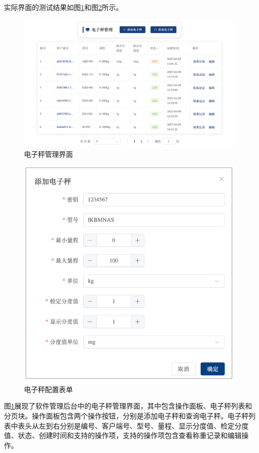 实际界面的测试结果如图\ref{fig:web-scale}和图\ref{fig:form-new-scale}所示。

\begin{figure}
    \centering
    \includegraphics[width=0.9\linewidth]{../result/web-scale.png}
    \caption{电子秤管理界面}
    \label{fig:web-scale}
\end{figure}

\begin{figure}
    \centering
    \includegraphics[width=0.9\linewidth]{../result/form-new-scale.png}
    \caption{电子秤配置表单}
    \label{fig:form-new-scale}
\end{figure}

图\ref{fig:web-scale}展现了软件管理后台中的电子秤管理界面，其中包含操作面板、电子秤列表和分页块。操作面板包含两个操作按钮，分别是添加电子秤和查询电子秤。电子秤列表中表头从左到右分别是编号、客户端号、型号、量程、显示分度值、检定分度值、状态、创建时间和支持的操作项，支持的操作项包含查看称重记录和编辑操作。

